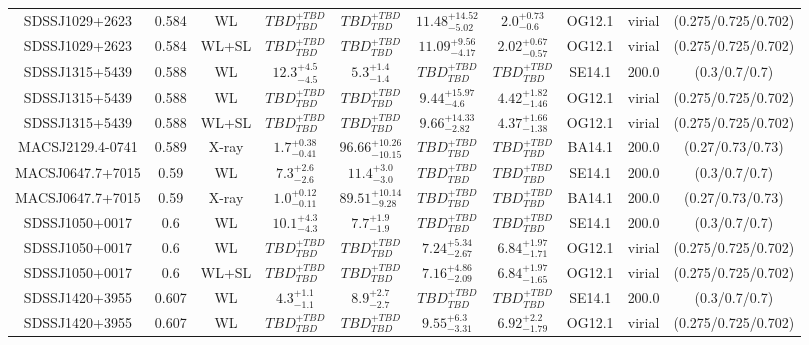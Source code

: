 \begin{table}
\begin{tabular}{cccccccccc}
SDSSJ1029+2623 & 0.584 & WL & ${TBD}^{+TBD}_{TBD}$ & ${TBD}^{+TBD}_{TBD}$ & ${11.48}^{+14.52}_{-5.02}$ & ${2.0}^{+0.73}_{-0.6}$ & OG12.1 & virial & (0.275/0.725/0.702) \\
SDSSJ1029+2623 & 0.584 & WL+SL & ${TBD}^{+TBD}_{TBD}$ & ${TBD}^{+TBD}_{TBD}$ & ${11.09}^{+9.56}_{-4.17}$ & ${2.02}^{+0.67}_{-0.57}$ & OG12.1 & virial & (0.275/0.725/0.702) \\
SDSSJ1315+5439 & 0.588 & WL & ${12.3}^{+4.5}_{-4.5}$ & ${5.3}^{+1.4}_{-1.4}$ & ${TBD}^{+TBD}_{TBD}$ & ${TBD}^{+TBD}_{TBD}$ & SE14.1 & 200.0 & (0.3/0.7/0.7) \\
SDSSJ1315+5439 & 0.588 & WL & ${TBD}^{+TBD}_{TBD}$ & ${TBD}^{+TBD}_{TBD}$ & ${9.44}^{+15.97}_{-4.6}$ & ${4.42}^{+1.82}_{-1.46}$ & OG12.1 & virial & (0.275/0.725/0.702) \\
SDSSJ1315+5439 & 0.588 & WL+SL & ${TBD}^{+TBD}_{TBD}$ & ${TBD}^{+TBD}_{TBD}$ & ${9.66}^{+14.33}_{-2.82}$ & ${4.37}^{+1.66}_{-1.38}$ & OG12.1 & virial & (0.275/0.725/0.702) \\
MACSJ2129.4-0741 & 0.589 & X-ray & ${1.7}^{+0.38}_{-0.41}$ & ${96.66}^{+10.26}_{-10.15}$ & ${TBD}^{+TBD}_{TBD}$ & ${TBD}^{+TBD}_{TBD}$ & BA14.1 & 200.0 & (0.27/0.73/0.73) \\
MACSJ0647.7+7015 & 0.59 & WL & ${7.3}^{+2.6}_{-2.6}$ & ${11.4}^{+3.0}_{-3.0}$ & ${TBD}^{+TBD}_{TBD}$ & ${TBD}^{+TBD}_{TBD}$ & SE14.1 & 200.0 & (0.3/0.7/0.7) \\
MACSJ0647.7+7015 & 0.59 & X-ray & ${1.0}^{+0.12}_{-0.11}$ & ${89.51}^{+10.14}_{-9.28}$ & ${TBD}^{+TBD}_{TBD}$ & ${TBD}^{+TBD}_{TBD}$ & BA14.1 & 200.0 & (0.27/0.73/0.73) \\
SDSSJ1050+0017 & 0.6 & WL & ${10.1}^{+4.3}_{-4.3}$ & ${7.7}^{+1.9}_{-1.9}$ & ${TBD}^{+TBD}_{TBD}$ & ${TBD}^{+TBD}_{TBD}$ & SE14.1 & 200.0 & (0.3/0.7/0.7) \\
SDSSJ1050+0017 & 0.6 & WL & ${TBD}^{+TBD}_{TBD}$ & ${TBD}^{+TBD}_{TBD}$ & ${7.24}^{+5.34}_{-2.67}$ & ${6.84}^{+1.97}_{-1.71}$ & OG12.1 & virial & (0.275/0.725/0.702) \\
SDSSJ1050+0017 & 0.6 & WL+SL & ${TBD}^{+TBD}_{TBD}$ & ${TBD}^{+TBD}_{TBD}$ & ${7.16}^{+4.86}_{-2.09}$ & ${6.84}^{+1.97}_{-1.65}$ & OG12.1 & virial & (0.275/0.725/0.702) \\
SDSSJ1420+3955 & 0.607 & WL & ${4.3}^{+1.1}_{-1.1}$ & ${8.9}^{+2.7}_{-2.7}$ & ${TBD}^{+TBD}_{TBD}$ & ${TBD}^{+TBD}_{TBD}$ & SE14.1 & 200.0 & (0.3/0.7/0.7) \\
SDSSJ1420+3955 & 0.607 & WL & ${TBD}^{+TBD}_{TBD}$ & ${TBD}^{+TBD}_{TBD}$ & ${9.55}^{+6.3}_{-3.31}$ & ${6.92}^{+2.2}_{-1.79}$ & OG12.1 & virial & (0.275/0.725/0.702) \\

\end{tabular}
\end{table}
